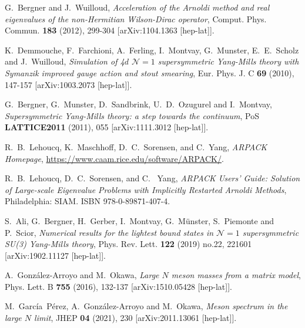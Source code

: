 \documentclass[a4paper,11pt]{article}
\begin{document}
\begin{thebibliography}{99}
G.~Bergner and J.~Wuilloud,
\textit{Acceleration of the Arnoldi method and real eigenvalues of the non-Hermitian Wilson-Dirac operator},
Comput. Phys. Commun. \textbf{183} (2012), 299-304
[arXiv:1104.1363 [hep-lat]].

K.~Demmouche, F.~Farchioni, A.~Ferling, I.~Montvay, G.~Munster, E.~E.~Scholz and J.~Wuilloud,
\textit{Simulation of 4$d$ $\mathcal{N}=1$ supersymmetric Yang-Mills theory with Symanzik improved gauge action and stout smearing},
Eur. Phys. J. C \textbf{69} (2010), 147-157
[arXiv:1003.2073 [hep-lat]]. 

G.~Bergner, G.~Munster, D.~Sandbrink, U.~D.~Ozugurel and I.~Montvay,
\textit{Supersymmetric Yang-Mills theory: a step towards the continuum},
PoS \textbf{LATTICE2011} (2011), 055
[arXiv:1111.3012 [hep-lat]].


R.~B.~Lehoucq, K.~Maschhoff, D.~C.~Sorensen, and C.~Yang,
\textit{ARPACK Homepage},
\url{https://www.caam.rice.edu/software/ARPACK/}.

R.~B.~Lehoucq,   D.~C.~Sorensen, and C.~ Yang, 
\textit{ARPACK Users' Guide: Solution of Large-scale Eigenvalue Problems with Implicitly Restarted Arnoldi Methods},
Philadelphia: SIAM. ISBN 978-0-89871-407-4.

S.~Ali, G.~Bergner, H.~Gerber, I.~Montvay, G.~M\"unster, S.~Piemonte and P.~Scior,
\textit{Numerical results for the lightest bound states in $\mathcal{N}=1$ supersymmetric SU(3) Yang-Mills theory},
Phys. Rev. Lett. \textbf{122} (2019) no.22, 221601
[arXiv:1902.11127 [hep-lat]].

A.~Gonz\'{a}lez-Arroyo and M.~Okawa,
\textit{Large $N$ meson masses from a matrix model},
Phys. Lett. B \textbf{755} (2016), 132-137
[arXiv:1510.05428 [hep-lat]].

M.~Garc\'{i}a~P\'erez, A.~Gonz\'{a}lez-Arroyo and M.~Okawa,
\textit{Meson spectrum in the large $N$ limit},
JHEP \textbf{04} (2021), 230
[arXiv:2011.13061 [hep-lat]].

\end{thebibliography}
\end{document}
